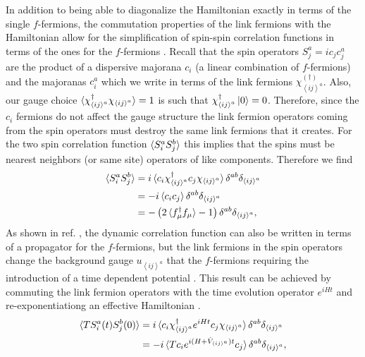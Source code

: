 \documentclass[aps,pra,preprint,groupedaddress]{revtex4-1}
\newcommand{\1}{\mathds{1}}
\begin{document}
In addition to being able to diagonalize the Hamiltonian exactly in terms of the single $f$-fermions, the commutation properties of the link fermions with the Hamiltonian allow for the simplification of spin-spin correlation functions in terms of the ones for the $f$-fermions \cite{Baskaran}. Recall that the spin operators $S^a_j= i c_j c^a_j$ are the product of a dispersive majorana $c_i$ (a linear combination of $f$-fermions) and the majoranas $c^a_i$ which we write in terms of the link fermions $\chi_{\left<ij\right>^a}^{(\dagger)}$. Also, our gauge choice $\braket{\chi_{\left<ij\right>^a}^{\dagger} \chi_{\left<ij\right>^a}} = 1$ is such that $\chi^\dagger_{\left<ij\right>^a} \ket{0} = 0$. Therefore, since the $c_i$ fermions do not affect the gauge structure the link fermion operators coming from the spin operators must destroy the same link fermions that it creates. For the two spin correlation function $\braket{S^a_i S^b_j}$ this implies that the spins must be nearest neighbors (or same site) operators of like components. Therefore we find \cite{Baskaran}
\begin{align}
\braket{S^a_i S^b_j} &= i\braket{ c_i \chi_{\left<ij\right>^a}^\dagger c_j  \chi_{\left<ij\right>^a}  } \delta^{ab} \delta_{\left<ij\right>^a} \nonumber \\
&= -i\braket{ c_i  c_j } \delta^{ab} \delta_{\left<ij\right>^a} \nonumber \\ %
&= -\left(2\braket{ f_\mu^\dagger f_\mu } - 1\right) \delta^{ab} \delta_{\left<ij\right>^a}, \label{sspins}
\end{align}
As shown in ref. , the dynamic correlation function can also be written in terms of a propagator for the $f$-fermions, but the link fermions in the spin operators change the background gauge $u_{\left<ij\right>^a}$ that the $f$-fermions requiring the introduction of a time dependent potential \cite{Baskaran}. This result can be achieved by commuting the link fermion operators with the time evolution operator $e^{iHt}$ and re-exponentiationg an effective Hamiltonian \cite{Baskaran}.   
\begin{align}\label{spins}
\braket{T S^a_i(t) S^b_j(0)} &= i\braket{ c_i \chi_{\left<ij\right>^a}^\dagger  e^{i H t} c_j \chi_{\left<ij\right>^a}   } \delta^{ab} \delta_{\left<ij\right>^a} \\
&= -i\braket{ T c_i e^{i (H+\hat{V}_{\left<ij\right>^a}) t} c_j}\delta^{ab} \delta_{\left<ij\right>^a}, \label{spins2}
\end{align}
\end{document}
